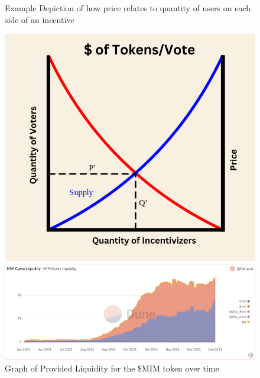 \documentclass{article}
\begin{document}
\newpage
\begin{figure}[p]
\centering
\caption{Example Depiction of how price relates to quantity of users on each side of an incentive}
\includegraphics[scale=0.35]{../misc/supplyDemand.png}

\caption{Graph of Provided Liquidity for the \$MIM token over time}
\includegraphics[scale=.8]{../misc/liquidity.png}
\end{figure}
\end{document}
